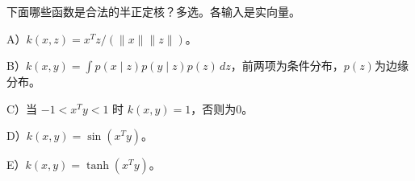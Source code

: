 下面哪些函数是合法的半正定核？多选。各输入是实向量。


A）\(k(x,z)=x^Tz/(\|x\|\|z\|)\)。


B）\(k(x,y)=\int p(x\mid z)p(y\mid z)p(z)\,dz\)，前两项为条件分布，\(p(z)\)为边缘分布。


C）当 \(-1<x^Ty<1\) 时 \(k(x,y)=1\)，否则为0。


D）\(k(x,y)=\sin(x^Ty)\)。


E）\(k(x,y)=\tanh(x^Ty)\)。
